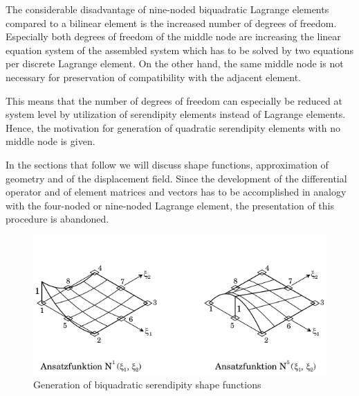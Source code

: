 The considerable disadvantage of nine-noded biquadratic Lagrange elements compared to
a bilinear element is the increased number of degrees of freedom. Especially both degrees of
freedom of the middle node are increasing the linear equation system of the assembled system
which has to be solved by two equations per discrete Lagrange element. On the other hand, the
same middle node is not necessary for preservation of compatibility with the adjacent element.

This means that the number of degrees of freedom can especially be reduced at system level
by utilization of serendipity elements instead of Lagrange elements. Hence, the motivation for
generation of quadratic serendipity elements with no middle node is given.

In the sections that follow we will discuss shape functions, approximation of geometry and of
the displacement field. Since the development of the differential operator and of element matrices
and vectors has to be accomplished in analogy with the four-noded or nine-noded Lagrange
element, the presentation of this procedure is abandoned.
\begin{figure}[H]
    \centering
    \includegraphics[scale=0.6]{Figure2/Chap2/shpaefunctionq8.png}
    \caption{Generation of biquadratic serendipity shape functions}
    \label{fig:my_label}
\end{figure}

